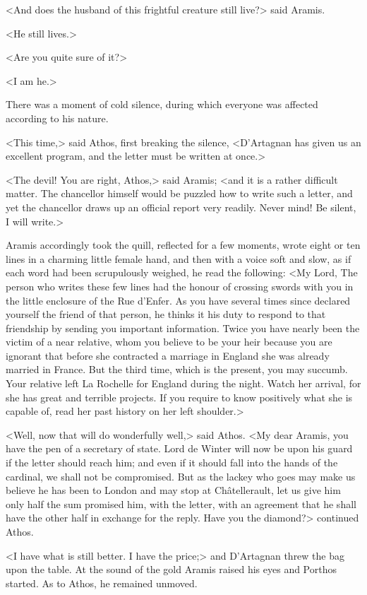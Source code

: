 <And does the husband of this frightful creature still live?> said Aramis. 

<He still lives.> 

<Are you quite sure of it?> 

<I am he.> 

There was a moment of cold silence, during which everyone was affected according to his nature. 

<This time,> said Athos, first breaking the silence, <D'Artagnan has given us an excellent program, and the letter must be written at once.> 

<The devil! You are right, Athos,> said Aramis; <and it is a rather difficult matter. The chancellor himself would be puzzled how to write such a letter, and yet the chancellor draws up an official report very readily. Never mind! Be silent, I will write.> 

Aramis accordingly took the quill, reflected for a few moments, wrote eight or ten lines in a charming little female hand, and then with a voice soft and slow, as if each word had been scrupulously weighed, he read the following: <My Lord, The person who writes these few lines had the honour of crossing swords with you in the little enclosure of the Rue d'Enfer. As you have several times since declared yourself the friend of that person, he thinks it his duty to respond to that friendship by sending you important information. Twice you have nearly been the victim of a near relative, whom you believe to be your heir because you are ignorant that before she contracted a marriage in England she was already married in France. But the third time, which is the present, you may succumb. Your relative left La Rochelle for England during the night. Watch her arrival, for she has great and terrible projects. If you require to know positively what she is capable of, read her past history on her left shoulder.> 

<Well, now that will do wonderfully well,> said Athos. <My dear Aramis, you have the pen of a secretary of state. Lord de Winter will now be upon his guard if the letter should reach him; and even if it should fall into the hands of the cardinal, we shall not be compromised. But as the lackey who goes may make us believe he has been to London and may stop at Châtellerault, let us give him only half the sum promised him, with the letter, with an agreement that he shall have the other half in exchange for the reply. Have you the diamond?> continued Athos. 

<I have what is still better. I have the price;> and D'Artagnan threw the bag upon the table. At the sound of the gold Aramis raised his eyes and Porthos started. As to Athos, he remained unmoved. 

